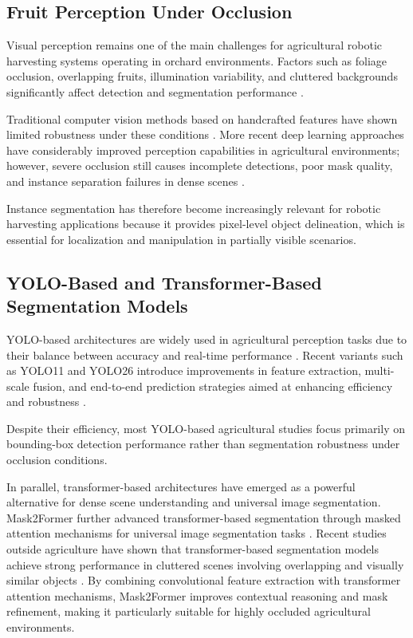 \documentclass[runningheads]{llncs}
\begin{document}
\subsection{Fruit Perception Under Occlusion}

Visual perception remains one of the main challenges for agricultural robotic
harvesting systems operating in orchard environments. Factors such as foliage
occlusion, overlapping fruits, illumination variability, and cluttered
backgrounds significantly affect detection and segmentation performance
\cite{10424305,10348779,10559970}.

Traditional computer vision methods based on handcrafted features have shown
limited robustness under these conditions \cite{han2012strawberry}. More
recent deep learning approaches have considerably improved perception
capabilities in agricultural environments; however, severe occlusion still
causes incomplete detections, poor mask quality, and instance separation
failures in dense scenes \cite{11347840,10839762}.

Instance segmentation has therefore become increasingly relevant for robotic
harvesting applications because it provides pixel-level object delineation,
which is essential for localization and manipulation in partially visible
scenarios.


\subsection{YOLO-Based and Transformer-Based Segmentation Models}

YOLO-based architectures are widely used in agricultural perception tasks due
to their balance between accuracy and real-time performance
\cite{10956721,11016889,11365044}. Recent variants such as YOLO11 and YOLO26
introduce improvements in feature extraction, multi-scale fusion, and
end-to-end prediction strategies aimed at enhancing efficiency and robustness
\cite{11100674,yolo26_architecture_2026,yolo26_evolution_2026}.

Despite their efficiency, most YOLO-based agricultural studies focus primarily
on bounding-box detection performance rather than segmentation robustness under
occlusion conditions.

In parallel, transformer-based architectures have emerged as a powerful
alternative for dense scene understanding and universal image segmentation.
Mask2Former further advanced transformer-based segmentation through masked
attention mechanisms for universal image segmentation tasks
\cite{cheng2021mask2former}. Recent studies outside agriculture have shown that
transformer-based segmentation models achieve strong performance in cluttered
scenes involving overlapping and visually similar objects
\cite{10491166,10972542,11100168}. By combining convolutional feature
extraction with transformer attention mechanisms, Mask2Former improves
contextual reasoning and mask refinement, making it particularly suitable for
highly occluded agricultural environments.
\end{document}
